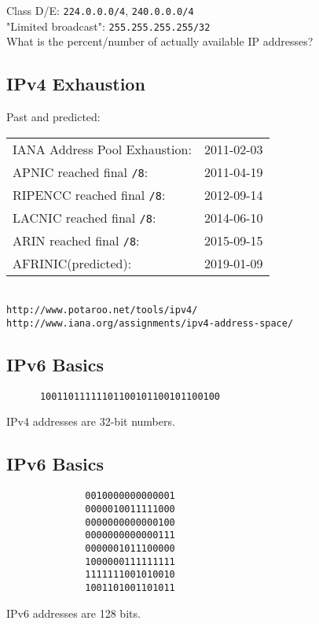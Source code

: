 \documentclass[xga]{xdvislides}
\begin{document}
Class D/E: {\tt 224.0.0.0/4}, {\tt 240.0.0.0/4}
\\

"Limited broadcast": {\tt 255.255.255.255/32}
\\

What is the percent/number of actually available IP addresses?



\subsection{IPv4 Exhaustion}
Past and predicted: \\

\begin{tabular}{l r}
IANA Address Pool Exhaustion: & 2011-02-03 \\
APNIC reached final {\tt /8}: & 2011-04-19 \\
RIPENCC reached final {\tt /8}: & 2012-09-14 \\
LACNIC reached final {\tt /8}: & 2014-06-10 \\
ARIN reached final {\tt /8}: & 2015-09-15 \\
AFRINIC(predicted): & 2019-01-09 \\
\end{tabular}
\\

\vspace{.5in}
{\tt http://www.potaroo.net/tools/ipv4/} \\
{\tt http://www.iana.org/assignments/ipv4-address-space/}

\subsection{IPv6 Basics}
\vspace{.5in}
\Hugesize
\begin{center}
\begin{verbatim}
      10011011111101100101100101100100
\end{verbatim}
\vspace{.5in}
IPv4 addresses are 32-bit numbers.
\end{center}
\Normalsize


\subsection{IPv6 Basics}
\Hugesize
\begin{center}
\begin{verbatim}
              0010000000000001
              0000010011111000
              0000000000000100
              0000000000000111
              0000001011100000
              1000000111111111
              1111111001010010
              1001101001101011
\end{verbatim}
\vspace{.5in}
IPv6 addresses are 128 bits.
\end{center}
\Normalsize
\end{document}
